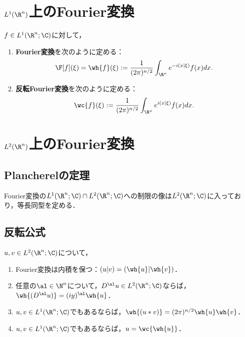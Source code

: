\documentclass[uplatex,dvipdfmx]{jsreport}
\begin{document}
\section{$L^1(\R^n)$上のFourier変換}

\begin{definition}
    $f\in L^1(\R^n;\C)$に対して，
    \begin{enumerate}
        \item \textbf{Fourier変換}を次のように定める：
        \[\F[f](\xi)=\wh{f}(\xi):=\frac{1}{(2\pi)^{n/2}}\int_{\R^n}e^{-i(x|\xi)}f(x)dx.\]
        \item \textbf{反転Fourier変換}を次のように定める：
        \[\wc{f}(\xi):=\frac{1}{(2\pi)^{n/2}}\int_{\R^n}e^{i(x|\xi)}f(x)dx.\]
    \end{enumerate}
\end{definition}

\section{$L^2(\R^n)$上のFourier変換}

\subsection{Plancherelの定理}

\begin{theorem}[Plancherel]
    Fourier変換の$L^1(\R^n;\C)\cap L^2(\R^n;\C)$への制限の像は$L^2(\R^n;\C)$に入っており，等長同型を定める．
\end{theorem}

\subsection{反転公式}

\begin{proposition}\label{prop-inversion-formula-for-Fourier-transform}
    $u,v\in L^2(\R^n;\C)$について，
    \begin{enumerate}
        \item Fourier変換は内積を保つ：$(u|v)=(\wh{u}|\wh{v})$．
        \item 任意の$\al\in\N^n$について，$D^\al u\in L^2(\R^n;\C)$ならば，$\wh{(D^\al u)}=(iy)^\al\wh{u}$．
        \item $u,v\in L^1(\R^n;\C)$でもあるならば，$\wh{(u*v)}=(2\pi)^{n/2}\wh{u}\wh{v}$．
        \item $u,v\in L^1(\R^n;\C)$でもあるならば，$u=\wc{\wh{u}}$．
    \end{enumerate}
\end{proposition}


\end{document}
